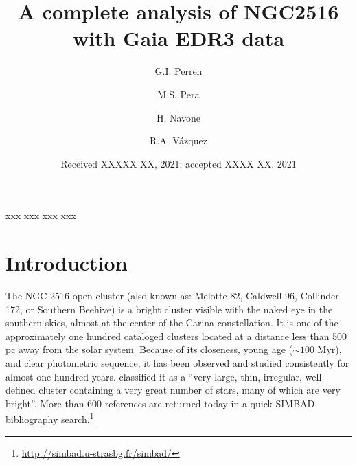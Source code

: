 \documentclass[draft]{aa}
\begin{document}
 


\title{A complete analysis of NGC2516 with Gaia EDR3 data}

\author{G.I. Perren \and
M.S. Pera  \and
H. Navone  \and
R.A. V\'azquez 
}


   \date{Received XXXXX XX, 2021; accepted XXXX XX, 2021}

 
  \abstract
   {xxx}
   {xxx}
   {xxx}
   {xxx}
   {}


   \maketitle



\section{Introduction}
 \label{sec:intro}

 The NGC 2516 open cluster (also known as: Melotte 82, Caldwell 96,
 Collinder 172, or Southern Beehive) is a bright cluster visible with the naked
 eye in the southern skies, almost at the center of the Carina constellation.
 It is one of the approximately one hundred cataloged clusters located at a
 distance less than 500 pc away from the solar system.
 Because of its closeness, young age ($\sim 100$ Myr), and clear photometric
 sequence, it has been observed and studied consistently for almost one hundred
 years.
 \citet{Raab_1922} classified it as a ``very large, thin, irregular,
 well defined cluster containing a very great number of stars, many of which are
 very bright''.
 More than 600 references are returned today in a quick SIMBAD bibliography
 search.\footnote{\url{http://simbad.u-strasbg.fr/simbad/}}\\
 
\end{document}

